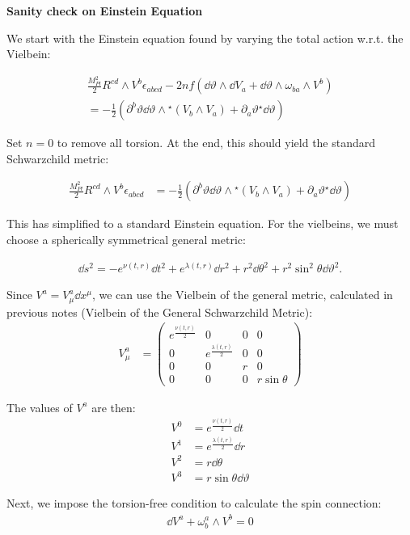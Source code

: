 \documentclass[12pt]{article}
\newcommand{\hodge}{{^\star}}
\begin{document}
\begin{center}
  \Large\textbf{Sanity check on Einstein Equation} \\
  \large{}
\end{center}

We start with the Einstein equation found by varying the total action w.r.t. the Vielbein: 

\begin{align}
  \frac{M_{Pl}^2}{2}R^{cd} \wedge V^b \epsilon_{abcd} - 2\mathit{nf}(\dd\vartheta \wedge \dd V_a + \dd\vartheta \wedge \omega_{ba} \wedge V^b) \nonumber \\ = - \frac{1}{2}(\partial^b\vartheta \dd\vartheta \wedge \hodge(V_b \wedge V_a) + \partial_a\vartheta \hodge\dd\vartheta)
\end{align}

Set $n=0$ to remove all torsion. At the end, this should yield the standard Schwarzchild metric:

\begin{align}
  \frac{M_{Pl}^2}{2}R^{cd} \wedge V^b \epsilon_{abcd} &= - \frac{1}{2}(\partial^b\vartheta \dd\vartheta \wedge \hodge(V_b \wedge V_a) + \partial_a\vartheta \hodge\dd\vartheta)
\end{align}

This has simplified to a standard Einstein equation. For the vielbeins, we must choose a spherically symmetrical general metric:

\begin{align}
  \dd s^2 = -e^{\nu(t,r)}\dd{t^2} + e^{\lambda(t,r)}\dd{r^2} + r^2\dd{\theta^2} + r^2\sin^2{\theta}\dd{\vartheta^2}.
\end{align}

Since $V^a = V^a_\mu \dd x^\mu$, we can use the Vielbein of the general metric, calculated in previous notes (Vielbein of the General Schwarzchild Metric):
\begin{align}
  V^a_\mu &= \begin{pmatrix}
    e^{\frac{\nu(t,r)}{2}} & 0 & 0 & 0 \\
    0 & e^{\frac{\lambda(t,r)}{2}} & 0 & 0 \\
    0 & 0 & r & 0 \\
    0 & 0 & 0 & r\sin{\theta}
  \end{pmatrix}
\end{align}

The values of $V^a$ are then:
\begin{align*}
  V^0 &= e^{\frac{\nu(t,r)}{2}} \dd{t} \\
  V^1 &= e^{\frac{\lambda(t,r)}{2}} \dd{r} \\
  V^2 &= r \dd{\theta} \\
  V^3 &= r\sin{\theta} \dd{\vartheta}
\end{align*}

Next, we impose the torsion-free condition to calculate the spin connection:
\begin{align}
  \dd{V^a} + \omega^a_b \wedge V^b = 0
\end{align}
\end{document}
